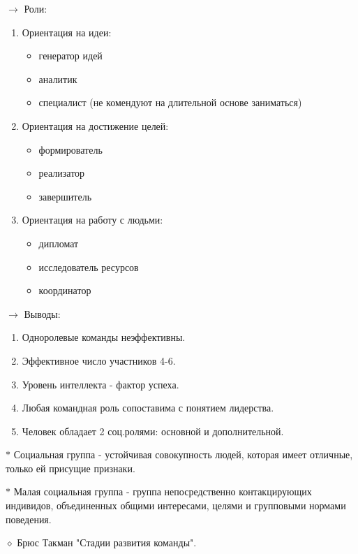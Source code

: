 \documentclass[12pt,a4paper]{report}
\begin{document}
\medskip 
$\rightarrow$ Роли:
\begin{enumerate}
	\item Ориентация на идеи:
	\begin{itemize}
		\item генератор идей
		\item аналитик
		\item специалист (не комендуют на длительной основе заниматься)
	\end{itemize}
	\item Ориентация на достижение целей:
	\begin{itemize}
		\item формирователь
		\item реализатор
		\item завершитель
	\end{itemize}
	\item Ориентация на работу с людьми:
	\begin{itemize}
		\item дипломат
		\item исследователь ресурсов
		\item координатор
	\end{itemize}
\end{enumerate}

\medskip 
$\rightarrow$ Выводы:
\begin{enumerate}
	\item Одноролевые команды неэффективны.
	\item Эффективное число участников 4-6.
	\item Уровень интеллекта - фактор успеха.
	\item Любая командная роль сопоставима с понятием лидерства.
	\item Человек обладает 2 соц.ролями: основной и дополнительной.
\end{enumerate}

\bigskip
$\ast$ Социальная группа - устойчивая совокупность людей, которая имеет отличные, только ей присущие признаки.

\medskip 
$\ast$ Малая социальная группа - группа непосредственно контакцирующих индивидов, объединенных общими интересами, целями и групповыми нормами поведения.

\bigskip 
$\diamond$ Брюс Такман "Стадии развития команды".
\end{document}

